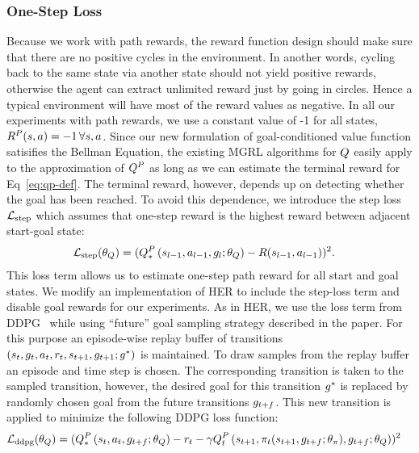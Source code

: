 \subsubsection{One-Step Loss}
Because we work with path rewards, the reward function design should
make sure that there are no positive cycles in the environment. In another
words, cycling back to the same state via another state should not yield
positive rewards, otherwise the agent can extract unlimited reward just by
going in circles. Hence a typical environment will have most of the reward
values as negative. In all our experiments with path rewards, we use a constant
value of -1 for all states, $\Rew^P(\state, \act) = -1 \, \forall \state, \act$.
Since our new formulation of goal-conditioned value function satisifies the
Bellman Equation, the existing MGRL algorithms for $\fw$ easily apply to the
approximation of $\fw^P$ as long as we can estimate the terminal reward for
Eq~\eqref{eq:qp-def}. The terminal reward, however, depends up on detecting
whether the goal has been reached. To avoid this dependence, we introduce the
step loss $\LossStep$ which assumes that one-step reward is the highest reward between
adjacent start-goal state:
%
\begin{align}
      \LossStep(\param_\fw) &= (\fwargs{\state_{l-1}}{\act_{l-1}}{\goal_{l};\param_\fw}{*}{P} - \Rew(\state_{l-1}, \act_{l-1}))^2.
\end{align}
%
This loss term allows us to estimate one-step path reward for all start and goal
states.
We modify an implementation of HER to include the step-loss term and disable goal
rewards for our experiments.
As in HER, we use the loss term from DDPG~\cite{lillicrap2015continuous} while
using ``future'' goal sampling strategy described in the paper.
For this purpose an episode-wise replay buffer of transitions $(\state_t,
\goal_t, \act_t, \rew_t, \state_{t+1}, \goal_{t+1}; \goal^*)$ is maintained. To draw samples
from the replay buffer an episode and time step is chosen. The corresponding
transition is taken to the sampled transition, however, the desired goal for
this transition $\goal^*$ is replaced by randomly chosen goal from the future
transitions $\goal_{t+f}$. This new transition is applied to minimize the
following DDPG loss function:
%
\begin{align}
  \LossDDPG(\param_\fw) &= (\fwargs{\state_{t}}{\act_{t}}{\goal_{t+f}; \param_\fw}{*}{P} -
      \rew_t - \discount\fwargs{\state_{t+1}}{\policy_t(\state_{t+1}, \goal_{t+f};\param_\policy)}{\goal_{t+f};\param_\fw}{t}{P})^2
\end{align}
%

